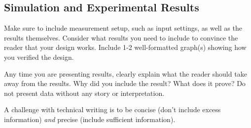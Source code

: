 \documentclass[journal]{IEEEtran} %
\begin{document}
\subsection{Simulation and Experimental Results}
Make sure to include measurement setup, such as input settings, as well as the results themselves. 
Consider what results you need to include to convince the reader that your design works. 
Include 1-2 well-formatted graph(s) showing how you verified the design. 

Any time you are presenting results, clearly explain what the reader should take away from the results.
Why did you include the result? What does it prove? 
Do not present data without any story or interpretation.

A challenge with technical writing is to be concise (don't include excess information) \textit{and} precise (include sufficient information). 




\begin{singlespace}
\printbibliography
\end{singlespace}
\end{document}
